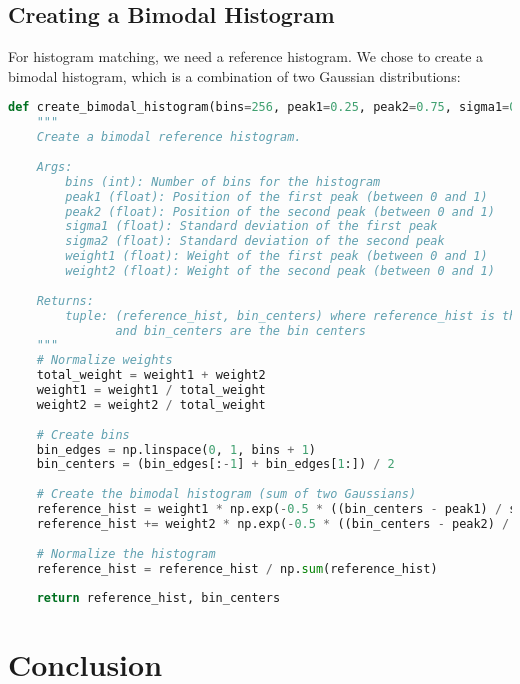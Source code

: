 \documentclass[12pt,a4paper]{article}
\begin{document}
\subsection{Creating a Bimodal Histogram}

For histogram matching, we need a reference histogram. We chose to create a bimodal histogram, which is a combination of two Gaussian distributions:

\begin{lstlisting}[language=Python, caption=Creating a bimodal histogram]
def create_bimodal_histogram(bins=256, peak1=0.25, peak2=0.75, sigma1=0.05, sigma2=0.05, weight1=0.5, weight2=0.5):
    """
    Create a bimodal reference histogram.
    
    Args:
        bins (int): Number of bins for the histogram
        peak1 (float): Position of the first peak (between 0 and 1)
        peak2 (float): Position of the second peak (between 0 and 1)
        sigma1 (float): Standard deviation of the first peak
        sigma2 (float): Standard deviation of the second peak
        weight1 (float): Weight of the first peak (between 0 and 1)
        weight2 (float): Weight of the second peak (between 0 and 1)
        
    Returns:
        tuple: (reference_hist, bin_centers) where reference_hist is the bimodal histogram
               and bin_centers are the bin centers
    """
    # Normalize weights
    total_weight = weight1 + weight2
    weight1 = weight1 / total_weight
    weight2 = weight2 / total_weight
    
    # Create bins
    bin_edges = np.linspace(0, 1, bins + 1)
    bin_centers = (bin_edges[:-1] + bin_edges[1:]) / 2
    
    # Create the bimodal histogram (sum of two Gaussians)
    reference_hist = weight1 * np.exp(-0.5 * ((bin_centers - peak1) / sigma1) ** 2) / (sigma1 * np.sqrt(2 * np.pi))
    reference_hist += weight2 * np.exp(-0.5 * ((bin_centers - peak2) / sigma2) ** 2) / (sigma2 * np.sqrt(2 * np.pi))
    
    # Normalize the histogram
    reference_hist = reference_hist / np.sum(reference_hist)
    
    return reference_hist, bin_centers
\end{lstlisting}

\section{Conclusion}
\end{document}
